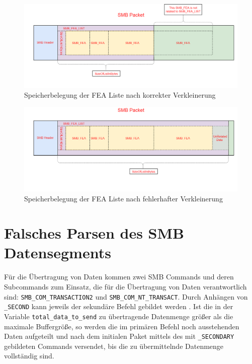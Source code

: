 \documentclass[DIV=12,headings=normal,pdftex,headinclude=false,footinclude=false,final]{scrreprt}
\begin{document}
\begin{figure}[H]
    \centering
    \includegraphics[width=15cm]{checkpoint_after_shrink_correct.png}
    \caption[FEAList nach korrekter Verkleinerung, Nadav Grossmann (Checkpoint Research), URL: \url{https://research.checkpoint.com/wp-content/uploads/2017/09/eternalblue5.png}]{Speicherbelegung der FEA Liste nach korrekter Verkleinerung}
    \label{img:fealist_after_shrinking_correctly}
\end{figure}

\begin{figure}[H]
    \centering
    \includegraphics[width=15cm]{checkpoint_after_shrink_error.png}
    \caption[FEAList nach fehlerhafter Verkleinerung, Nadav Grossmann (Checkpoint Research), URL: \url{https://research.checkpoint.com/wp-content/uploads/2017/09/eternalblue6.png}]{Speicherbelegung der FEA Liste nach fehlerhafter Verkleinerung}
    \label{img:fealist_after_shrinking_incorrectly}
\end{figure}

\section{Falsches Parsen des SMB Datensegments}\label{sec:Wrong_Parse}
Für die Übertragung von Daten kommen zwei SMB Commands und deren Subcommands zum Einsatz, die für die Übertragung von Daten verantwortlich sind: \verb|SMB_COM_TRANSACTION2| und \verb|SMB_COM_NT_TRANSACT|. Durch Anhängen von \verb|_SECOND| kann jeweils der sekundäre Befehl gebildet werden \cite{MS:SMBCom}. Ist die in der Variable \verb|total_data_to_send| zu übertragende Datenmenge größer als die maximale Buffergröße, so werden die im primären Befehl noch ausstehenden Daten aufgeteilt und nach dem initialen Paket mittels des mit \verb|_SECONDARY|  gebildeten Commands versendet, bis die zu übermittelnde Datenmenge vollständig sind\cite{TM:EB}.
\end{document}
